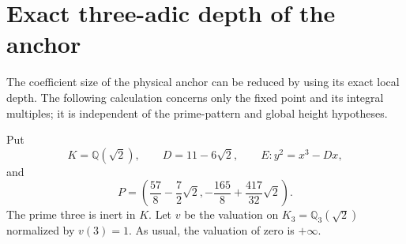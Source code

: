 \section{Exact three-adic depth of the anchor}
\label{sec:three-adic-anchor-depth}

The coefficient size of the physical anchor can be reduced by using its
exact local depth.  The following calculation concerns only the fixed
point and its integral multiples; it is independent of the prime-pattern
and global height hypotheses.

Put
\[
 K=\mathbb Q(\sqrt2),\qquad D=11-6\sqrt2,\qquad
 E:y^2=x^3-Dx,
\]
and
\[
 P=\left(\frac{57}{8}-\frac72\sqrt2,
          -\frac{165}{8}+\frac{417}{32}\sqrt2\right).
\]
The prime three is inert in $K$.  Let $v$ be the valuation on
$K_3=\mathbb Q_3(\sqrt2)$ normalized by $v(3)=1$.
As usual, the valuation of zero is $+\infty$.

